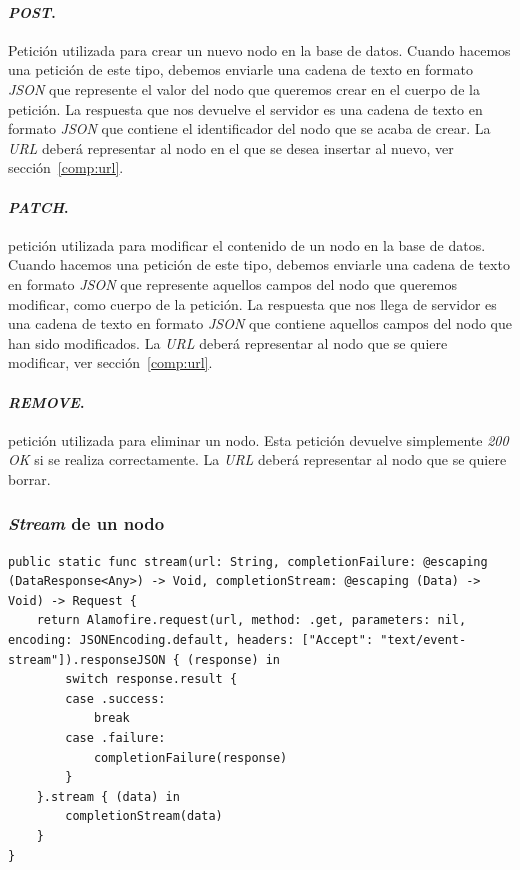 \paragraph{\textit{POST}.} Petición utilizada para crear un nuevo nodo en la base de datos. Cuando hacemos una petición de este tipo, debemos enviarle una cadena de texto en formato \textit{JSON} que represente el valor del nodo que queremos crear en el cuerpo de la petición. La respuesta que nos devuelve el servidor es una cadena de texto en formato \textit{JSON} que contiene el identificador del nodo que se acaba de crear. La \textit{URL} deberá representar al nodo en el que se desea insertar al nuevo, ver sección~\ref{comp:url}.

\paragraph{\textit{PATCH}.} petición utilizada para modificar el contenido de un nodo en la base de datos. Cuando hacemos una petición de este tipo, debemos enviarle una cadena de texto en formato \textit{JSON} que represente aquellos campos del nodo que queremos modificar, como cuerpo de la petición. La respuesta que nos llega de servidor es una cadena de texto en formato \textit{JSON} que contiene aquellos campos del nodo que han sido modificados. La \textit{URL} deberá representar al nodo que se quiere modificar, ver sección~\ref{comp:url}.

\paragraph{\textit{REMOVE}.} petición utilizada para eliminar un nodo. Esta petición devuelve simplemente \textit{200 OK} si se realiza correctamente. La \textit{URL} deberá representar al nodo que se quiere borrar.

\subsubsection*{\textit{Stream} de un nodo}

\begin{lstlisting}[style=interfaces,caption=Fragmento de código correspondiente a un \textit{streaming}.,label={list:alamo-stream}]
public static func stream(url: String, completionFailure: @escaping (DataResponse<Any>) -> Void, completionStream: @escaping (Data) -> Void) -> Request {
	return Alamofire.request(url, method: .get, parameters: nil, encoding: JSONEncoding.default, headers: ["Accept": "text/event-stream"]).responseJSON { (response) in
		switch response.result {
		case .success:
			break
		case .failure:
			completionFailure(response)
		}
	}.stream { (data) in
		completionStream(data)
	}
}
\end{lstlisting}

